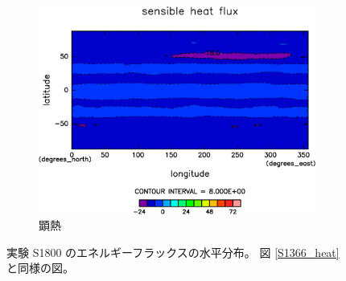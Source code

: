 \documentclass[body]{subfiles}
\begin{document}
\begin{figure}[t]
\begin{subfigure}{.4\textwidth}
		\includegraphics[width=\textwidth]{S1800/Sens,time=3650:4015-crop-rotate.pdf}
		\caption{顕熱\hmu*{[W/m^{-2}]}}\label{S1800顕熱}
	\end{subfigure}
	\caption[実験 S1800 のエネルギーフラックスの水平分布]{
		実験 S1800 のエネルギーフラックスの水平分布。
		図 \ref{S1366_heat} と同様の図。
	}\label{S1800_heat}
\end{figure}
\end{document}

